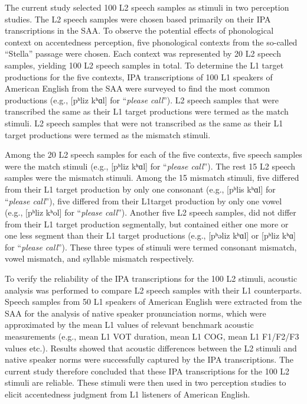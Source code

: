 The current study selected 100 L2 speech samples as stimuli in two perception studies. The L2 speech samples were chosen based primarily on their IPA transcriptions in the SAA. To observe the potential effects of phonological context on accentedness perception, five phonological contexts from the so-called “Stella” passage were chosen. Each context was represented by 20 L2 speech samples, yielding 100 L2 speech samples in total. To determine the L1 target productions for the five contexts, IPA transcriptions of 100 L1 speakers of American English from the SAA were surveyed to find the most common productions (e.g., [pʰliz kʰɑl] for “\textit{please call}”). L2 speech samples that were transcribed the same as their L1 target productions were termed as the match stimuli. L2 speech samples that were not transcribed as the same as their L1 target productions were termed as the mismatch stimuli. 

Among the 20 L2 speech samples for each of the five contexts, five speech samples were the match stimuli (e.g., [pʰliz kʰɑl] for “\textit{please call}”). The rest 15 L2 speech samples were the mismatch stimuli. Among the 15 mismatch stimuli, five differed from their L1 target production by only one consonant (e.g., [pʰlis kʰɑl] for “\textit{please call}”), five differed from their L1target production by only one vowel (e.g., [pʰliz kʰol] for “\textit{please call}”). Another five L2 speech samples, did not differ from their L1 target production segmentally, but contained either one more or one less segment than their L1 target productions (e.g., [pʰəliz kʰɑl] or [pʰliz kʰɑ] for “\textit{please call}”). These three types of stimuli were termed consonant mismatch, vowel mismatch, and syllable mismatch respectively. 

To verify the reliability of the IPA transcriptions for the 100 L2 stimuli, acoustic analysis was performed to compare L2 speech samples with their L1 counterparts. Speech samples from 50 L1 speakers of American English were extracted from the SAA for the analysis of native speaker pronunciation norms, which were approximated by the mean L1 values of relevant benchmark acoustic measurements (e.g., mean L1 VOT duration, mean L1 COG, mean L1 F1/F2/F3 values etc.). Results showed that acoustic differences between the L2 stimuli and native speaker norms were successfully captured by the IPA transcriptions. The current study therefore concluded that these IPA transcriptions for the 100 L2 stimuli are reliable. These stimuli were then used in two perception studies to elicit accentedness judgment from L1 listeners of American English. 

































